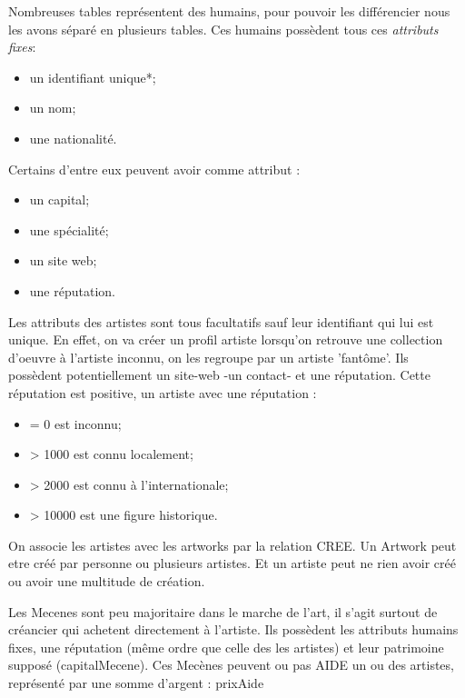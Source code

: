 \documentclass{article}
\begin{document}
\begin{multicols}{2}[]
Nombreuses tables représentent des humains, pour pouvoir les différencier nous les avons séparé en plusieurs tables.
Ces humains possèdent tous ces \emph{attributs fixes}:
\begin{itemize}[label=\(\blacktriangleright\)]
    \item un identifiant unique*;
    \item un nom;
    \item une nationalité.
\end{itemize}

Certains d'entre eux peuvent avoir comme attribut :
\begin{itemize}[label=\(\blacktriangleright\)]
    \item un capital;
    \item une spécialité;
    \item un site web;
    \item une réputation.
\end{itemize}
\end{multicols}


Les attributs des artistes sont tous facultatifs sauf leur identifiant qui lui est unique.
En effet, on va créer un profil artiste lorsqu'on retrouve une collection d'oeuvre à l'artiste inconnu, on les regroupe par un artiste 'fantôme'.
Ils possèdent potentiellement un site-web -un contact- et une réputation.
Cette réputation est positive, un artiste avec une réputation :
\begin{itemize}[label=\(\blacktriangleright\)]
    \item = 0 est inconnu;
    \item > 1000 est connu localement;
    \item > 2000 est connu à l'internationale;
    \item > 10000 est une figure historique.
\end{itemize}

On associe les artistes avec les artworks par la relation CREE.
Un Artwork peut etre créé par personne ou plusieurs artistes. Et un artiste peut ne rien avoir créé ou avoir une multitude de création.


Les Mecenes sont peu majoritaire dans le marche de l'art,
il s'agit surtout de créancier qui achetent directement à l'artiste. 
Ils possèdent les attributs humains fixes, une réputation (même ordre que celle des les artistes) et leur patrimoine supposé (capitalMecene).
Ces Mecènes peuvent ou pas AIDE un ou des artistes, représenté par une somme d'argent : prixAide 
\end{document}
